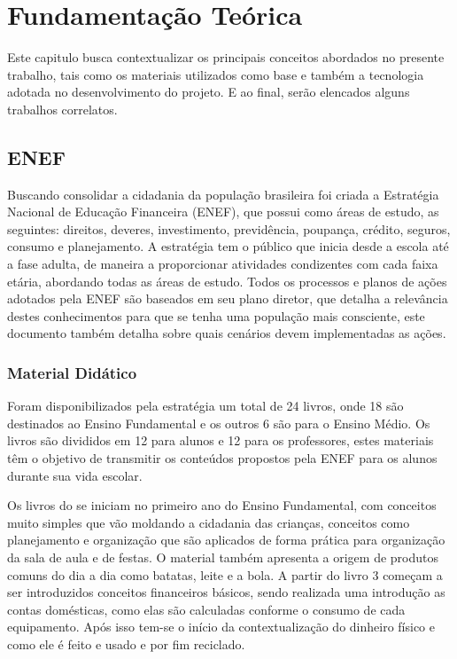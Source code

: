 \chapter{Fundamentação Teórica}
    Este capitulo busca contextualizar os principais conceitos abordados no presente trabalho, tais como os materiais
    utilizados como base e também a tecnologia adotada no desenvolvimento do projeto. E ao final, serão elencados alguns
    trabalhos correlatos.

    \section{ENEF}
        Buscando consolidar a cidadania da população brasileira foi criada a Estratégia Nacional de Educação Financeira
        (ENEF), que possui como áreas de estudo, as seguintes: direitos, deveres, investimento, previdência, poupança,
        crédito, seguros, consumo e planejamento. A estratégia tem o público que inicia desde a escola até a fase adulta,
        de maneira a proporcionar atividades condizentes com cada faixa etária, abordando todas as áreas de estudo.
        Todos os processos e planos de ações adotados pela ENEF são baseados em seu plano diretor, que detalha a
        relevância destes conhecimentos para que se tenha uma população mais consciente, este documento também detalha
        sobre quais cenários devem implementadas as ações.

        \subsection{Material Didático}
            Foram disponibilizados pela estratégia um total de 24 livros, onde 18 são destinados ao Ensino Fundamental e
            os outros 6 são para o Ensino Médio. Os livros são divididos em 12 para alunos e 12 para os professores,
            estes materiais têm o objetivo de transmitir os conteúdos propostos pela ENEF para os alunos durante sua
            vida escolar.

            Os livros do se iniciam no primeiro ano do Ensino Fundamental, com conceitos muito simples que vão moldando
            a cidadania das crianças, conceitos como planejamento e organização que são aplicados de forma prática para
            organização da sala de aula e de festas. O material também apresenta a origem de produtos comuns do dia a
            dia como batatas, leite e a bola. A partir do livro 3 começam a ser introduzidos conceitos financeiros
            básicos, sendo realizada uma introdução as contas domésticas, como elas são calculadas conforme o consumo de
            cada equipamento. Após isso tem-se o início da contextualização do dinheiro físico e como ele é feito e
            usado e por fim reciclado.

